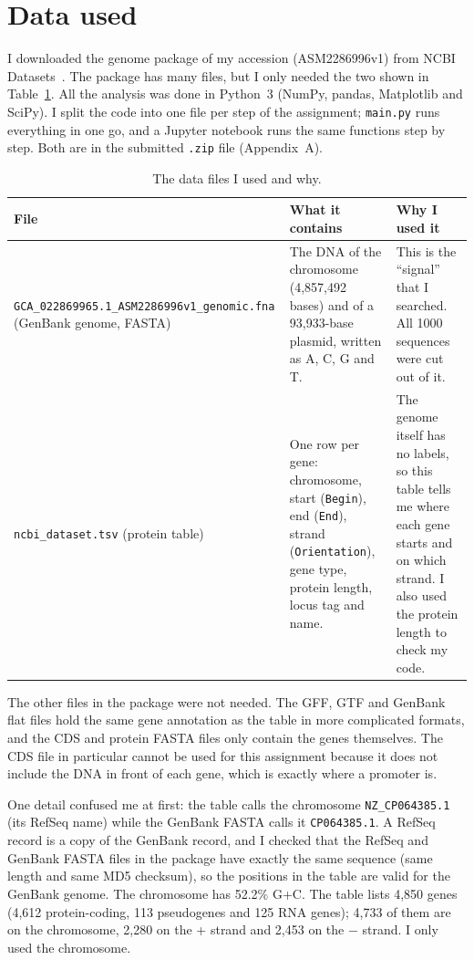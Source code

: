 \documentclass[11pt,a4paper]{article}
\begin{document}
\section{Data used}
I downloaded the genome package of my accession (ASM2286996v1) from NCBI Datasets~\cite{ncbi}. The
package has many files, but I only needed the two shown in Table~\ref{tab:files}. All the analysis
was done in Python~3 (NumPy, pandas, Matplotlib and SciPy). I split the code into one file per
step of the assignment; \texttt{main.py} runs everything in one go, and a Jupyter notebook runs the
same functions step by step. Both are in the submitted \texttt{.zip} file (Appendix~A).

\begin{table}[htbp]
\centering
\caption{The data files I used and why.}
\label{tab:files}
\small
\begin{tabular}{>{\raggedright\arraybackslash}p{4.3cm}>{\raggedright\arraybackslash}p{5.4cm}>{\raggedright\arraybackslash}p{5.6cm}}
\toprule
File & What it contains & Why I used it\\
\midrule
\texttt{GCA\_022869965.1\_}\allowbreak\texttt{ASM2286996v1\_}\allowbreak\texttt{genomic.fna} (GenBank genome, FASTA) &
The DNA of the chromosome (4,857,492 bases) and of a 93,933-base plasmid, written as A, C, G and T. &
This is the ``signal'' that I searched. All 1000 sequences were cut out of it.\\[3pt]
\texttt{ncbi\_dataset.tsv} (protein table) &
One row per gene: chromosome, start (\texttt{Begin}), end (\texttt{End}), strand
(\texttt{Orientation}), gene type, protein length, locus tag and name. &
The genome itself has no labels, so this table tells me where each gene starts and on which
strand. I also used the protein length to check my code.\\
\bottomrule
\end{tabular}
\end{table}

The other files in the package were not needed. The GFF, GTF and GenBank flat files hold the same
gene annotation as the table in more complicated formats, and the CDS and protein FASTA files only
contain the genes themselves. The CDS file in particular cannot be used for this assignment because
it does not include the DNA in front of each gene, which is exactly where a promoter is.

One detail confused me at first: the table calls the chromosome \texttt{NZ\_CP064385.1} (its RefSeq
name) while the GenBank FASTA calls it \texttt{CP064385.1}. A RefSeq record is a copy of the GenBank
record, and I checked that the RefSeq and GenBank FASTA files in the package have exactly the same
sequence (same length and same MD5 checksum), so the positions in the table are valid for the GenBank
genome. The chromosome has 52.2\% G+C. The table lists 4,850 genes (4,612 protein-coding, 113
pseudogenes and 125 RNA genes); 4,733 of them are on the chromosome, 2,280 on the + strand and 2,453
on the $-$ strand. I only used the chromosome.
\end{document}
